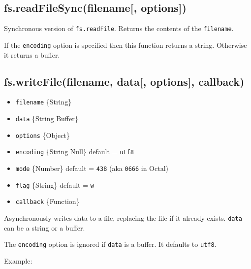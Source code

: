 \subsection{fs.readFileSync(filename{[},
options{]})}\label{fs.readfilesyncfilename-options}

Synchronous version of \texttt{fs.readFile}. Returns the contents of the
\texttt{filename}.

If the \texttt{encoding} option is specified then this function returns
a string. Otherwise it returns a buffer.

\subsection{fs.writeFile(filename, data{[}, options{]},
callback)}\label{fs.writefilefilename-data-options-callback}

\begin{itemize}
\itemsep1pt\parskip0pt
\item
  \texttt{filename} \{String\}
\item
  \texttt{data} \{String \textbar{} Buffer\}
\item
  \texttt{options} \{Object\}
\item
  \texttt{encoding} \{String \textbar{} Null\} default =
  \texttt{\textquotesingle{}utf8\textquotesingle{}}
\item
  \texttt{mode} \{Number\} default = \texttt{438} (aka \texttt{0666} in
  Octal)
\item
  \texttt{flag} \{String\} default =
  \texttt{\textquotesingle{}w\textquotesingle{}}
\item
  \texttt{callback} \{Function\}
\end{itemize}

Asynchronously writes data to a file, replacing the file if it already
exists. \texttt{data} can be a string or a buffer.

The \texttt{encoding} option is ignored if \texttt{data} is a buffer. It
defaults to \texttt{\textquotesingle{}utf8\textquotesingle{}}.

Example:

\begin{Shaded}
\begin{Highlighting}[]
\NormalTok{(}\NormalTok{, }\NormalTok{, } 
    
  \NormalTok{(}\NormalTok{);}
\NormalTok{\});}
\end{Highlighting}
\end{Shaded}

